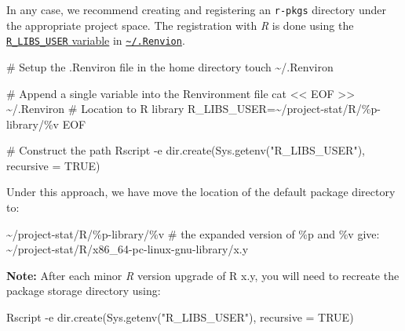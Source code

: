 \documentclass[
  letterpaper,
  DIV=11,
  numbers=noendperiod]{scrreport}
\newenvironment{Shaded}{\begin{snugshade}}{\end{snugshade}}
\newcommand{\AttributeTok}[1]{\textcolor[rgb]{0.40,0.45,0.13}{#1}}
\newcommand{\CommentTok}[1]{\textcolor[rgb]{0.37,0.37,0.37}{#1}}
\newcommand{\ExtensionTok}[1]{\textcolor[rgb]{0.00,0.23,0.31}{#1}}
\newcommand{\FunctionTok}[1]{\textcolor[rgb]{0.28,0.35,0.67}{#1}}
\newcommand{\NormalTok}[1]{\textcolor[rgb]{0.00,0.23,0.31}{#1}}
\newcommand{\OperatorTok}[1]{\textcolor[rgb]{0.37,0.37,0.37}{#1}}
\newcommand{\SpecialCharTok}[1]{\textcolor[rgb]{0.37,0.37,0.37}{#1}}
\newcommand{\StringTok}[1]{\textcolor[rgb]{0.13,0.47,0.30}{#1}}
\begin{document}
In any case, we recommend creating and registering an \texttt{r-pkgs}
directory under the appropriate project space. The registration with
\emph{R} is done using the
\href{https://stat.ethz.ch/R-manual/R-patched/library/base/html/libPaths.html}{\texttt{R\_LIBS\_USER}
variable} in
\href{https://stat.ethz.ch/R-manual/R-patched/library/base/html/Startup.html}{\texttt{\textasciitilde{}/.Renvion}}.

\begin{Shaded}
\begin{Highlighting}[]
\CommentTok{\# Setup the .Renviron file in the home directory}
\FunctionTok{touch}\NormalTok{ \textasciitilde{}/.Renviron}

\CommentTok{\# Append a single variable into the Renvironment file}
\FunctionTok{cat} \OperatorTok{\textless{}\textless{} \textquotesingle{}EOF\textquotesingle{}} \OperatorTok{\textgreater{}\textgreater{}}\NormalTok{ \textasciitilde{}/.Renviron}
\StringTok{\# Location to R library}
\StringTok{R\_LIBS\_USER=\textasciitilde{}/project{-}stat/R/\%p{-}library/\%v}
\OperatorTok{EOF}

\CommentTok{\# Construct the path}
\ExtensionTok{Rscript} \AttributeTok{{-}e} \StringTok{\textquotesingle{}dir.create(Sys.getenv("R\_LIBS\_USER"), recursive = TRUE)\textquotesingle{}}
\end{Highlighting}
\end{Shaded}

Under this approach, we have move the location of the default package
directory to:

\begin{Shaded}
\begin{Highlighting}[]
\ExtensionTok{\textasciitilde{}/project{-}stat/R/\%p{-}library/\%v}
\CommentTok{\# the expanded version of \%p and \%v give:}
\ExtensionTok{\textasciitilde{}/project{-}stat/R/x86\_64{-}pc{-}linux{-}gnu{-}library/x.y}
\end{Highlighting}
\end{Shaded}

\textbf{Note:} After each minor \emph{R} version upgrade of R x.y, you
will need to recreate the package storage directory using:

\begin{Shaded}
\begin{Highlighting}[]
\NormalTok{Rscript }\SpecialCharTok{{-}}\NormalTok{e }\StringTok{\textquotesingle{}dir.create(Sys.getenv("R\_LIBS\_USER"), recursive = TRUE)\textquotesingle{}}
\end{Highlighting}
\end{Shaded}
\end{document}
